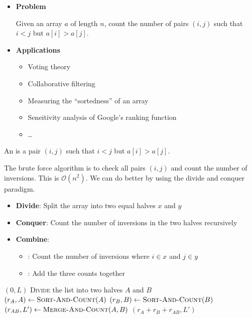 \begin{itemize}
    \item \textbf{Problem}
    
    Given an array $a$ of length $n$, count the number of pairs $(i, j)$ such that $i < j$ but $a[i] > a[j]$.

    \item \textbf{Applications}
    
    \begin{itemize}
        \item Voting theory
        \item Collaborative filtering 
        \item Measuring the ``sortedness'' of an array
        \item Seneitivity analysis of Google's ranking function 
        \item \dots
    \end{itemize}
\end{itemize}

\begin{definition}[Inversion]\label{def:inversion}
    An  is a pair $(i, j)$ such that $i < j$ but $a[i] > a[j]$.
\end{definition}

The brute force algorithm is to check all pairs $(i, j)$ and count the number of inversions. This is $\mathcal{O}(n^2)$. We can do better by using the divide and conquer paradigm.

\begin{itemize}
    \item \textbf{Divide}: Split the array into two equal halves $x$ and $y$
    \item \textbf{Conquer}: Count the number of inversions in the two halves recursively
    \item \textbf{Combine}:
    \begin{itemize}
        \item {}: Count the number of inversions where $i \in x$ and $j \in y$
        \item {}: Add the three counts together
    \end{itemize}
\end{itemize}

\begin{algorithm}    
    \begin{algorithmic}[1]
                \State \Return $(0, L)$
            \EndIf
            \State
            \State \textsc{\color{primary}Divide} the list into two halves $A$ and $B$
            \State $(r_A, A) \gets \Call{Sort-And-Count}{A}$
            \State $(r_B, B) \gets \Call{Sort-And-Count}{B}$
            \State $(r_{AB}, L') \gets \Call{Merge-And-Count}{A, B}$
            \State
            \State \Return $(r_A + r_B + r_{AB}, L')$
        \EndFunction
    \end{algorithmic}
\end{algorithm}

